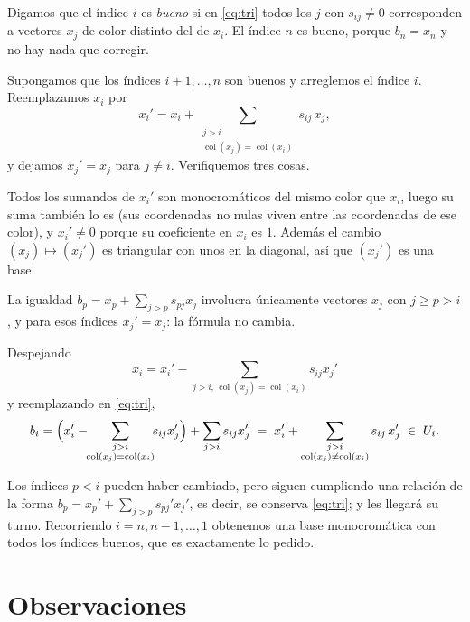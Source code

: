\documentclass[11pt]{amsproc}
\newcommand{\col}{\operatorname{col}}
\begin{document}
Digamos que el índice $i$ es \emph{bueno} si en \eqref{eq:tri} todos los $j$ con
$s_{ij}\neq 0$ corresponden a vectores $x_j$ de color distinto del de $x_i$. El
índice $n$ es bueno, porque $b_n=x_n$ y no hay nada que corregir.

Supongamos que los índices $i+1,\dots,n$ son buenos y arreglemos el índice $i$.
Reemplazamos $x_i$ por
\[
  x_i'=x_i+\sum_{\substack{j>i\\ \col(x_j)=\col(x_i)}} s_{ij}\,x_j ,
\]
y dejamos $x_j'=x_j$ para $j\neq i$. Verifiquemos tres cosas.

Todos los sumandos de $x_i'$ son
monocromáticos del mismo color que $x_i$, luego su suma también lo es (sus
coordenadas no nulas viven entre las coordenadas de ese color), y $x_i'\neq 0$ porque
su coeficiente en $x_i$ es $1$. Además el cambio $(x_j)\mapsto(x_j')$ es triangular
con unos en la diagonal, así que $(x_j')$ es una base.

La igualdad
$b_p=x_p+\sum_{j>p}s_{pj}x_j$ involucra únicamente vectores $x_j$ con $j\ge p>i$, y
para esos índices $x_j'=x_j$: la fórmula no cambia.

Despejando
\[
  x_i=x_i'-\sum_{j>i,\,\col(x_j)=\col(x_i)}s_{ij}x_j'
\]
y reemplazando en
\eqref{eq:tri},
\[
  b_i=\Bigl(x_i'-\!\!\sum_{\substack{j>i\\ \col(x_j)=\col(x_i)}}\!\! s_{ij}x_j'\Bigr)
      +\sum_{j>i}s_{ij}x_j'
   \;=\; x_i'+\sum_{\substack{j>i\\ \col(x_j)\neq\col(x_i)}} s_{ij}\,x_j' \;\in\; U_i .
\]

Los índices $p<i$ pueden haber cambiado, pero siguen cumpliendo una relación de la
forma $b_p=x_p'+\sum_{j>p}s_{pj}'x_j'$, es decir, se conserva \eqref{eq:tri}; y les
llegará su turno. Recorriendo $i=n,n-1,\dots,1$ obtenemos una base monocromática con
todos los índices buenos, que es exactamente lo pedido. 

\section*{Observaciones}
\end{document}
